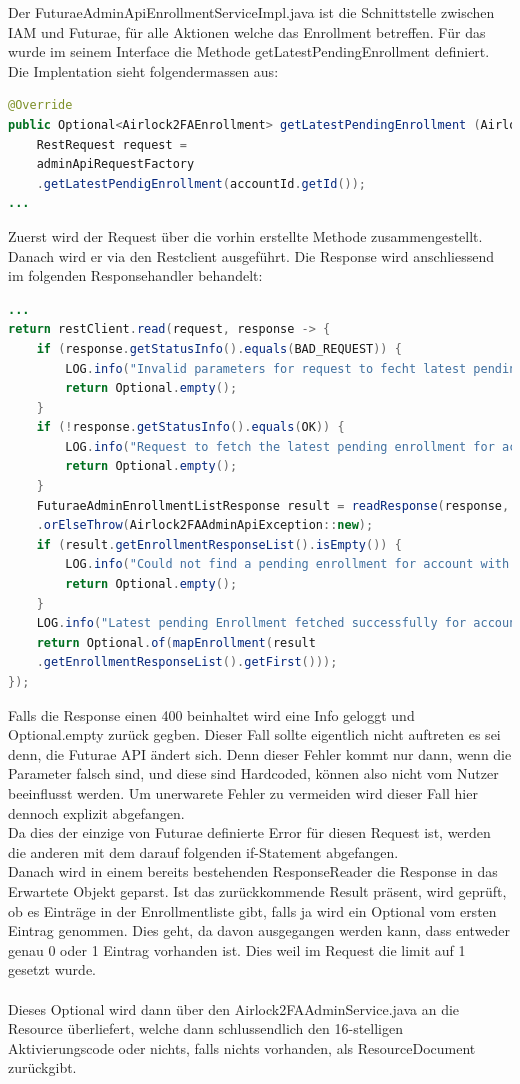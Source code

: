 Der FuturaeAdminApiEnrollmentServiceImpl.java ist die Schnittstelle zwischen IAM und Futurae, für alle Aktionen welche das Enrollment betreffen. Für das wurde im seinem Interface die Methode \flqq getLatestPendingEnrollment\frqq{} definiert. Die Implentation sieht folgendermassen aus:
\begin{lstlisting}[language=Java]
@Override
public Optional<Airlock2FAEnrollment> getLatestPendingEnrollment (Airlock2FAAccountId accountId) {
	RestRequest request = 
	adminApiRequestFactory
	.getLatestPendigEnrollment(accountId.getId());
...
\end{lstlisting}
Zuerst wird der Request über die vorhin erstellte Methode zusammengestellt.
Danach wird er via den Restclient ausgeführt. Die Response wird anschliessend im folgenden Responsehandler behandelt:
\begin{lstlisting}[language=Java]
...
return restClient.read(request, response -> {
	if (response.getStatusInfo().equals(BAD_REQUEST)) {
		LOG.info("Invalid parameters for request to fecht latest pending enrollment for account with id: " + accountId.getId());
		return Optional.empty();
	}
	if (!response.getStatusInfo().equals(OK)) {
		LOG.info("Request to fetch the latest pending enrollment for account with id '" + accountId.getId() + "' failed with code: " + response.getStatusInfo());
		return Optional.empty();
	}
	FuturaeAdminEnrollmentListResponse result = readResponse(response, FuturaeAdminEnrollmentListResponse.class, request)
	.orElseThrow(Airlock2FAAdminApiException::new);
	if (result.getEnrollmentResponseList().isEmpty()) {
		LOG.info("Could not find a pending enrollment for account with id: " + accountId.getId());
		return Optional.empty();
	}
	LOG.info("Latest pending Enrollment fetched successfully for account with id: " + accountId.getId());
	return Optional.of(mapEnrollment(result
	.getEnrollmentResponseList().getFirst()));
});
\end{lstlisting}
Falls die Response einen 400 beinhaltet wird eine Info geloggt und Optional.empty zurück gegben. Dieser Fall sollte eigentlich nicht auftreten es sei denn, die Futurae API ändert sich. Denn dieser Fehler kommt nur dann, wenn die Parameter falsch sind, und diese sind Hardcoded, können also nicht vom Nutzer beeinflusst werden. Um unerwarete Fehler zu vermeiden wird dieser Fall hier dennoch explizit abgefangen.\\
Da dies der einzige von Futurae definierte Error für diesen Request ist, werden die anderen mit dem darauf folgenden if-Statement abgefangen.\\
Danach wird in einem bereits bestehenden ResponseReader die Response in das Erwartete Objekt geparst. Ist das zurückkommende Result präsent, wird geprüft, ob es Einträge in der Enrollmentliste gibt, falls ja wird ein Optional vom ersten Eintrag genommen. Dies geht, da davon ausgegangen werden kann, dass entweder genau 0 oder 1 Eintrag vorhanden ist. Dies weil im Request die limit auf 1 gesetzt wurde.\\
\\
Dieses Optional wird dann über den Airlock2FAAdminService.java an die Resource überliefert, welche dann schlussendlich den 16-stelligen Aktivierungscode oder nichts, falls nichts vorhanden, als ResourceDocument zurückgibt.

